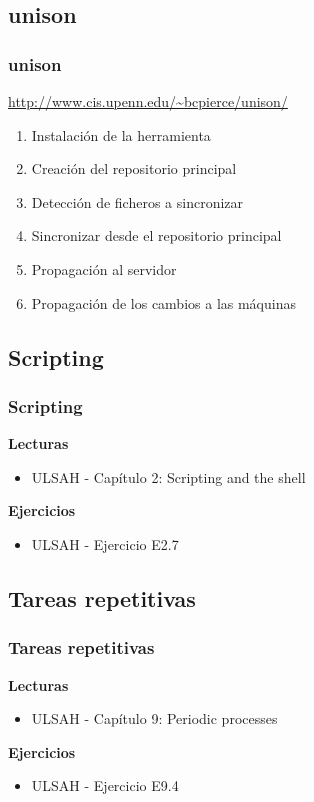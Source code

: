 \documentclass{beamer}
\begin{document}
\subsection{unison}
\begin{frame}
  \frametitle{unison}
  \begin{center}
    \url{http://www.cis.upenn.edu/~bcpierce/unison/}
  \end{center}
  \begin{enumerate}
    \item Instalación de la herramienta
    \item Creación del repositorio principal
    \item Detección de ficheros a sincronizar
    \item Sincronizar desde el repositorio principal
    \item Propagación al servidor
    \item Propagación de los cambios a las máquinas
  \end{enumerate}
\end{frame}

\subsection{Scripting}
\begin{frame}
  \frametitle{Scripting}
  \textbf{Lecturas}
  \begin{itemize}
    \item ULSAH - Capítulo 2: Scripting and the shell
  \end{itemize}
  \vspace{1cm}
  \textbf{Ejercicios}
  \begin{itemize}
    \item ULSAH - Ejercicio E2.7
  \end{itemize}
\end{frame}

\subsection{Tareas repetitivas}
\begin{frame}
  \frametitle{Tareas repetitivas}
  \textbf{Lecturas}
  \begin{itemize}
    \item ULSAH - Capítulo 9: Periodic processes
  \end{itemize}
  \vspace{1cm}
  \textbf{Ejercicios}
  \begin{itemize}
    \item ULSAH - Ejercicio E9.4
  \end{itemize}
\end{frame}
\end{document}
